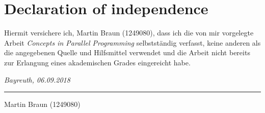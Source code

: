 \documentclass[paper=A4,twoside=true,openright,parskip=full,chapterprefix=true,headings=normal,bibliography=totoc,listof=totoc,titlepage=on,captions=tableabove,draft=false,british]{scrreprt}%
\newcommand{\thesisTitle}{Concepts in Parallel Programming}
\newcommand{\thesisName}{Martin Braun (1249080)}
\newcommand{\thesisDate}{06.09.2018}
\newcommand{\thesisUniversityCity}{Bayreuth}
\begin{document}
\cleardoublepage

%
\chapter*{Declaration of independence}
\label{sec:declaration}
\thispagestyle{empty}

Hiermit versichere ich, {\thesisName}, dass ich die von mir vorgelegte Arbeit
\emph{\thesisTitle} selbstständig verfasst, keine anderen als die angegebenen
Quelle und Hilfsmittel verwendet und die  Arbeit  nicht  bereits  zur  Erlangung  eines
akademischen  Grades  eingereicht habe.

\smallskip

\noindent\textit{\thesisUniversityCity, \thesisDate}

\smallskip

\begin{flushright}
	\begin{minipage}{5cm}
		\rule{\textwidth}{1pt}
		\centering\thesisName
	\end{minipage}
\end{flushright}


\cleardoublepage


\listoffigures
\cleardoublepage

\listoftables
\cleardoublepage

\pagestyle{empty}

\clearpage
\newpage
\mbox{}

\end{document}

